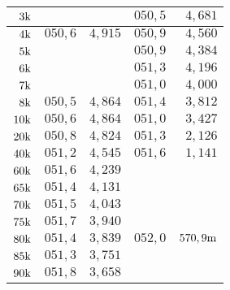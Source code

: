 \begin{table}[H]
\begin{tabular}{r||r|r||r|r|}
\multicolumn{1}{|r||}{$3\text{k}$}                       &$              $&$             $&$ 050,5    $&$ 4,681        $\\ \hline
\multicolumn{1}{|r||}{$4\text{k}$}                       &$ 050,6     $&$ 4,915       $&$ 050,9    $&$ 4,560        $\\ \hline
\multicolumn{1}{|r||}{$5\text{k}$}                       &$              $&$             $&$ 050,9    $&$ 4,384        $\\ \hline
\multicolumn{1}{|r||}{$6\text{k}$}                       &$              $&$             $&$ 051,3    $&$ 4,196        $\\ \hline
\multicolumn{1}{|r||}{$7\text{k}$}                       &$              $&$             $&$ 051,0    $&$ 4,000        $\\ \hline
\multicolumn{1}{|r||}{$8\text{k}$}                       &$ 050,5     $&$ 4,864       $&$ 051,4    $&$ 3,812        $\\ \hline
\multicolumn{1}{|r||}{$10\text{k}$}                      &$ 050,6     $&$ 4,864       $&$ 051,0    $&$ 3,427        $\\ \hline
\multicolumn{1}{|r||}{$20\text{k}$}                      &$ 050,8     $&$ 4,824       $&$ 051,3    $&$ 2,126        $\\ \hline
\multicolumn{1}{|r||}{$40\text{k}$}                      &$ 051,2     $&$ 4,545       $&$ 051,6    $&$ 1,141        $\\ \hline
\multicolumn{1}{|r||}{$60\text{k}$}                      &$ 051,6     $&$ 4,239       $&$             $&$              $\\ \hline
\multicolumn{1}{|r||}{$65\text{k}$}                      &$ 051,4     $&$ 4,131       $&$             $&$              $\\ \hline
\multicolumn{1}{|r||}{$70\text{k}$}                      &$ 051,5     $&$ 4,043       $&$             $&$              $\\ \hline
\multicolumn{1}{|r||}{$75\text{k}$}                      &$ 051,7     $&$ 3,940       $&$             $&$              $\\ \hline
\multicolumn{1}{|r||}{$80\text{k}$}                      &$ 051,4     $&$ 3,839       $&$ 052,0    $&$ 570,9\text{m}     $\\ \hline
\multicolumn{1}{|r||}{$85\text{k}$}                      &$ 051,3     $&$ 3,751       $&$             $&$              $\\ \hline
\multicolumn{1}{|r||}{$90\text{k}$}                      &$ 051,8     $&$ 3,658       $&$             $&$              $\\ \hline

\end{tabular}
\end{table}
